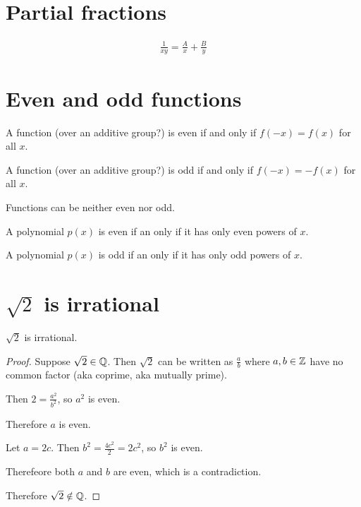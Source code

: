 \section{Partial fractions}

\begin{align*}
  \frac{1}{xy} = \frac{A}{x} + \frac{B}{y}
\end{align*}

\section{Even and odd functions}

\begin{definition*}
  A function (over an additive group?) is even if and only if $f(-x) = f(x)$ for all $x$.

  A function (over an additive group?) is odd if and only if $f(-x) = -f(x)$ for all $x$.
\end{definition*}

Functions can be neither even nor odd.

\begin{claim*}
  A polynomial $p(x)$ is even if an only if it has only even powers of $x$.

  A polynomial $p(x)$ is odd if an only if it has only odd powers of $x$.
\end{claim*}

\section{$\sqrt{2}$ is irrational}
\begin{claim*}
  $\sqrt{2}$ is irrational.
\end{claim*}

\begin{proof}
  Suppose $\sqrt{2} \in \mathbb{Q}$. Then $\sqrt{2}$ can be written as $\frac{a}{b}$ where $a, b \in \mathbb{Z}$
  have no common factor (aka coprime, aka mutually prime).

  Then $2 = \frac{a^2}{b^2}$, so $a^2$ is even.

  Therefore $a$ is even.

  Let $a = 2c$. Then $b^2 = \frac{4c^2}{2} = 2c^2$, so $b^2$ is even.

  Therefeore both $a$ and $b$ are even, which is a contradiction.

  Therefore $\sqrt{2} \notin \mathbb{Q}$.
\end{proof}


